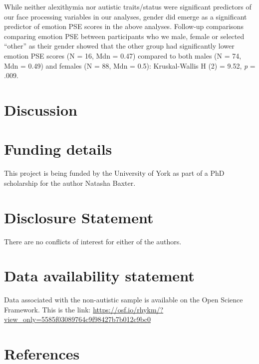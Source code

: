 \documentclass[
]{article}
\begin{document}
While neither alexithymia nor autistic traits/status were significant predictors of our face processing variables in our analyses, gender did emerge as a significant predictor of emotion PSE scores in the above analyses. Follow-up comparisons comparing emotion PSE between participants who we male, female or selected ``other'' as their gender showed that the other group had significantly lower emotion PSE scores (N = 16, Mdn = 0.47) compared to both males (N = 74, Mdn = 0.49) and females (N = 88, Mdn = 0.5): Kruskal-Wallis H (2) = 9.52, \emph{p} = .009.

\hypertarget{discussion}{%
\section*{Discussion}\label{discussion}}

\hypertarget{funding-details}{%
\section*{Funding details}\label{funding-details}}

This project is being funded by the University of York as part of a PhD scholarship for the author Natasha Baxter.

\hypertarget{disclosure-statement}{%
\section*{Disclosure Statement}\label{disclosure-statement}}

There are no conflicts of interest for either of the authors.

\hypertarget{data-availability-statement}{%
\section*{Data availability statement}\label{data-availability-statement}}

Data associated with the non-autistic sample is available on the Open Science Framework. This is the link: \url{https://osf.io/rhykm/?view_only=5585f03089764c9f98427b7b012c9bc0}

\hypertarget{references}{%
\section*{References}\label{references}}
\end{document}
